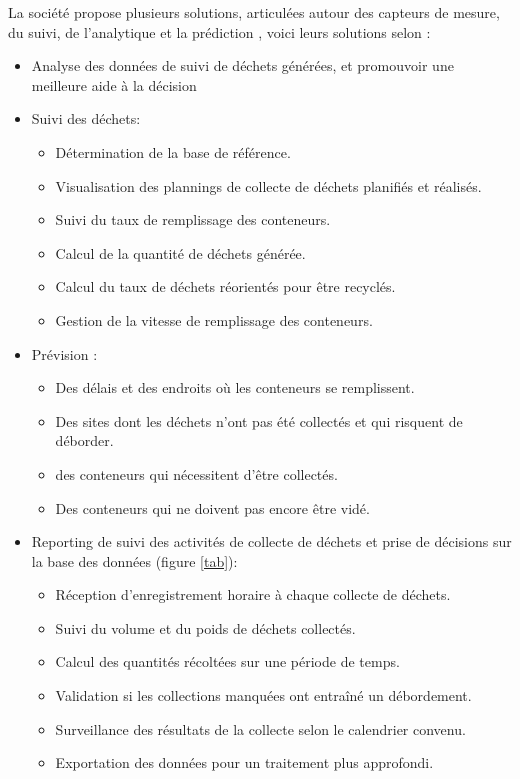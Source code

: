 \documentclass[a4paper,12pt]{report}
\begin{document}
La société propose plusieurs solutions, articulées autour des capteurs de mesure, du suivi, de l'analytique et la prédiction \cite{ref9}, voici leurs solutions selon \cite{ref9} :
\begin{itemize}
\item Analyse des données de suivi de déchets générées, et promouvoir une meilleure aide à la décision
\item Suivi des déchets:
\begin{itemize}
\item Détermination de la base de référence.
\item Visualisation des plannings de collecte de déchets planifiés et réalisés.
\item Suivi du taux de remplissage des conteneurs.
\item Calcul de la quantité de déchets générée.
\item Calcul du taux de déchets réorientés pour être recyclés.
\item Gestion de la vitesse de remplissage des conteneurs.
\end{itemize}
\item Prévision : 
\begin{itemize}
\item Des délais et des endroits où les conteneurs se remplissent.
\item Des sites dont les déchets n'ont pas été collectés et qui risquent de déborder.
\item des conteneurs qui nécessitent d'être collectés.
\item Des conteneurs qui ne doivent pas encore être vidé.
\end{itemize}
\item Reporting de suivi des activités de collecte de déchets et prise de décisions sur la base des données (figure \ref{tab}):
\begin{itemize}
\item Réception d'enregistrement horaire à chaque collecte de déchets.
\item Suivi du volume et du poids de déchets collectés.
\item Calcul des quantités récoltées sur une période de temps.
\item Validation si les collections manquées ont entraîné un débordement.
\item Surveillance des résultats de la collecte selon le calendrier convenu.
\item Exportation des données pour un traitement plus approfondi.

\end{itemize}
\end{itemize}
\end{document}
